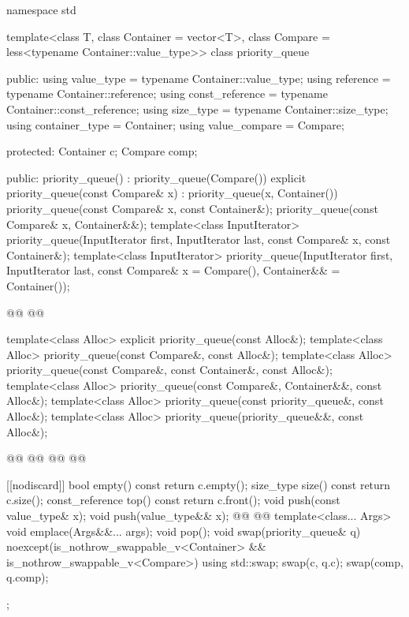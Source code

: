 \documentclass{wg21}
\begin{document}
\begin{codeblock}
namespace std {
template<class T, class Container = vector<T>,
class Compare = less<typename Container::value_type>>
class priority_queue {
    public:
    using value_type      = typename Container::value_type;
    using reference       = typename Container::reference;
    using const_reference = typename Container::const_reference;
    using size_type       = typename Container::size_type;
    using container_type  = Container;
    using value_compare   = Compare;

    protected:
    Container c;
    Compare comp;

    public:
    priority_queue() : priority_queue(Compare()) {}
    explicit priority_queue(const Compare& x) : priority_queue(x, Container()) {}
    priority_queue(const Compare& x, const Container&);
    priority_queue(const Compare& x, Container&&);
    template<class InputIterator>
    priority_queue(InputIterator first, InputIterator last, const Compare& x,
        const Container&);
    template<class InputIterator>
    priority_queue(InputIterator first, InputIterator last,
        const Compare& x = Compare(), Container&& = Container());

    @@
    @@


    template<class Alloc> explicit priority_queue(const Alloc&);
    template<class Alloc> priority_queue(const Compare&, const Alloc&);
    template<class Alloc> priority_queue(const Compare&, const Container&, const Alloc&);
    template<class Alloc> priority_queue(const Compare&, Container&&, const Alloc&);
    template<class Alloc> priority_queue(const priority_queue&, const Alloc&);
    template<class Alloc> priority_queue(priority_queue&&, const Alloc&);

    @@
    @@
    @@
    @@


    [[nodiscard]] bool empty() const { return c.empty(); }
    size_type size()  const          { return c.size(); }
    const_reference   top() const    { return c.front(); }
    void push(const value_type& x);
    void push(value_type&& x);
    @@
    @@
    template<class... Args> void emplace(Args&&... args);
    void pop();
    void swap(priority_queue& q) noexcept(is_nothrow_swappable_v<Container> &&
    is_nothrow_swappable_v<Compare>)
    { using std::swap; swap(c, q.c); swap(comp, q.comp); }
};

}
\end{codeblock}
\end{document}
